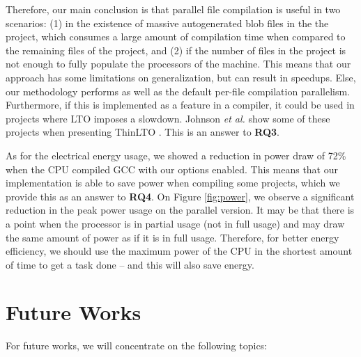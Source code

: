 Therefore, our main conclusion is that parallel file compilation is useful in
two scenarios: (1) in the existence of massive autogenerated blob files in the
the project, which consumes a large amount of compilation time when compared to
the remaining files of the project, and (2) if the number of files in the
project is not enough to fully populate the processors of the machine. This
means that our approach has some limitations on generalization, but can result in
speedups. Else, our methodology performs as well as the default per-file
compilation parallelism.  Furthermore, if this is implemented as a feature in a
compiler, it could be used in projects where LTO imposes a slowdown.  Johnson
\textit{et al.} show some of these projects when presenting ThinLTO
\citep{thinlto}. This is an answer to \textbf{RQ3}.

As for the electrical energy usage, we showed a reduction in power draw of 72\%
when the CPU compiled GCC with our options enabled. This means that our
implementation is able to save power when compiling some projects, which we
provide this as an answer to \textbf{RQ4}. On Figure \ref{fig:power}, we
observe a significant reduction in the peak power usage on the parallel
version. It may be that there is a point when the processor is in partial usage
(not in full usage) and may draw the same amount of power as if it is in full
usage. Therefore, for better energy efficiency, we should use the maximum power
of the CPU in the shortest amount of time to get a task done -- and this will
also save energy.

\section{Future Works}

For future works, we will concentrate on the following topics:

